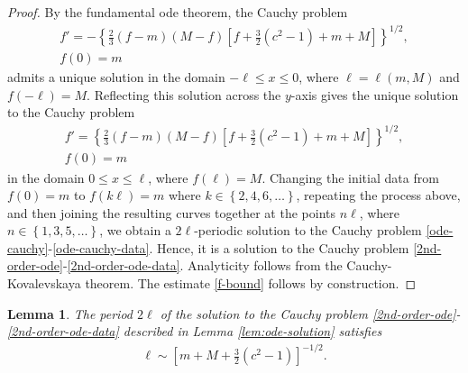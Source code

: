 \documentclass[12pt,reqno]{amsart}
\numberwithin{equation}{section}  %
\newtheorem{lemma}[theorem]{Lemma}
\begin{document}
\begin{proof}
By the fundamental ode theorem, the Cauchy problem
\begin{gather}
  \label{ode-cauchy-left}
   f'
  = -\left \{ \frac{2}{3} \left (f-m\right )
  \left( M -f \right )
  \left [ f + \frac{3}{2}(c^{2} -1) +m +M \right ] \right
  \}^{1/2},
  \\
\label{ode-cauchy-data-left}
   f(0) = m
\end{gather}
admits a unique solution in the domain $-\ell \le x \le 0$, where $\ell =
\ell(m, M)$ and $f(-\ell) = M$. Reflecting this solution across the $y$-axis
gives the unique solution to the Cauchy problem 
\begin{gather}
  \label{ode-cauchy-right}
   f'
  = \left \{ \frac{2}{3} \left (f-m\right )
  \left( M -f \right )
  \left [ f + \frac{3}{2}(c^{2} -1) +m +M  \right ] \right
  \}^{1/2},
  \\
\label{ode-cauchy-data-right}
   f(0) = m
\end{gather}
in the domain $0 \le x \le \ell$, where $f(\ell) = M$. 
Changing the
initial data from $f(0) = m$ to $f(k\ell)=m$ where $k \in \left\{ 2, 4, 6,\dots
\right\}$, repeating the process above, and then joining the resulting curves
together at the points $n \ell$, where $n \in \left\{ 1,3,5,\dots \right\}$, we
obtain a $2\ell$-periodic
solution to the Cauchy problem \eqref{ode-cauchy}-\eqref{ode-cauchy-data}.
Hence, it is a solution to the Cauchy problem
\eqref{2nd-order-ode}-\eqref{2nd-order-ode-data}. Analyticity follows from the
Cauchy-Kovalevskaya theorem. The
estimate \eqref{f-bound} follows by construction.
%
%
\end{proof}
%
%
%
%
%
%
%
%
%
%
%
\begin{lemma}
  The period $2 \ell$ of the solution to the Cauchy problem
  \eqref{2nd-order-ode}-\eqref{2nd-order-ode-data} described in Lemma
  \ref{lem:ode-solution} satisfies
  \begin{equation}
  \begin{split}
    \ell \sim \left [m + M + \frac{3}{2}(c^{2}-1) \right ]^{-1/2}.
  \end{split}
  \label{period-est}
  \end{equation}
\label{lem:period-est}
\end{lemma}
%
%
%
%
\end{document}
